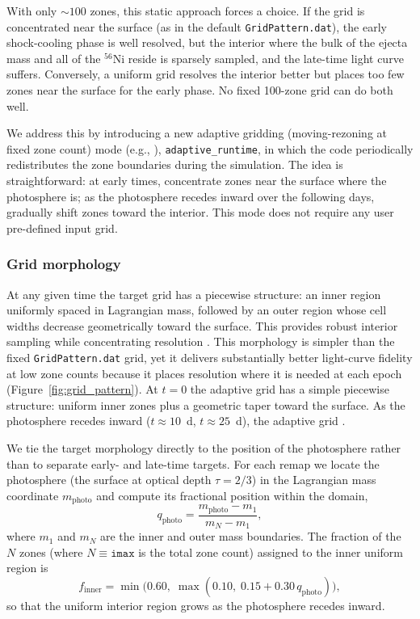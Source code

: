 \documentclass[twocolumn,linenumbers]{aastex701}
\begin{document}
With only $\sim100$ zones, this static approach forces a choice. If the grid is concentrated near the surface (as in the default \texttt{Grid\-Pattern.dat}), the early shock-cooling phase is well resolved, but the interior where the bulk of the ejecta mass and all of the $^{56}$Ni reside is sparsely sampled, and the late-time light curve suffers. Conversely, a uniform grid resolves the interior better but places too few zones near the surface for the early phase. No fixed 100-zone grid can do both well.

We address this by introducing a new adaptive gridding (moving-rezoning at fixed zone count) mode (e.g., \citealp{HartenHyman1983,DorfiDrury1987}), \texttt{adaptive\_\-runtime}, in which the code periodically redistributes the zone boundaries during the simulation. The idea is straightforward: at early times, concentrate zones near the surface where the photosphere is; as the photosphere recedes inward over the following days, gradually shift zones toward the interior. This mode does not require any user pre-defined input grid.

\subsubsection{Grid morphology}
\label{sec:grid_morphology}

At any given time the target grid has a piecewise structure: an inner region uniformly spaced in Lagrangian mass, followed by an outer region whose cell widths decrease geometrically toward the surface. This provides robust interior sampling while concentrating resolution . This morphology is simpler than the fixed \texttt{GridPattern.dat} grid, yet it delivers substantially better light-curve fidelity at low zone counts because it places resolution where it is needed at each epoch (Figure~\ref{fig:grid_pattern}).  At $t=0$ the adaptive grid has a simple piecewise structure: uniform inner zones plus a geometric taper toward the surface. As the photosphere recedes inward ($t\approx10$~d, $t\approx25$~d), the adaptive grid .

We tie the target morphology directly to the position of the photosphere rather than to separate early- and late-time targets. For each remap we locate the photosphere (the surface at optical depth $\tau = 2/3$) in the Lagrangian mass coordinate $m_{\mathrm{photo}}$ and compute its fractional position within the domain,
\begin{equation}
q_{\mathrm{photo}} = \frac{m_{\mathrm{photo}} - m_1}{m_N - m_1},
\end{equation}
where $m_1$ and $m_N$ are the inner and outer mass boundaries. The fraction of the $N$ zones (where $N \equiv \texttt{imax}$ is the total zone count) assigned to the inner uniform region is
\begin{equation}
f_{\mathrm{inner}} = \min\!\bigl(0.60,\;\max(0.10,\;0.15 + 0.30\,q_{\mathrm{photo}})\bigr),
\end{equation}
so that the uniform interior region grows as the photosphere recedes inward.
\end{document}
